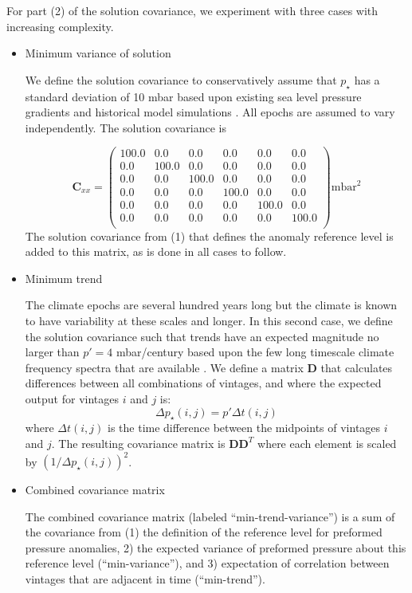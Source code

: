 \documentclass[12pt]{article}
\begin{document}
For part (2) of the solution covariance, we experiment with three cases with increasing complexity.
\begin{itemize}
\item Minimum variance of solution

  We define the solution covariance to conservatively assume that $p_{\star}$ has a standard deviation of 10 mbar based upon existing sea level pressure gradients and
  historical model simulations \cite{Hakim-Emile-Geay-2016:last}. All epochs are assumed to vary independently. The solution covariance is
  
\begin{equation}
\label{eq:6}
\mathbf{C}_{xx} = \left(
\begin{array}{cccccc}
100.0 & 0.0 & 0.0 & 0.0 & 0.0 & 0.0 \\
0.0 & 100.0 & 0.0 & 0.0 & 0.0 & 0.0 \\
0.0 & 0.0 & 100.0 & 0.0 & 0.0 & 0.0 \\
0.0 & 0.0 & 0.0 & 100.0 & 0.0 & 0.0 \\
0.0 & 0.0 & 0.0 & 0.0 & 100.0 & 0.0 \\
0.0 & 0.0 & 0.0 & 0.0 & 0.0 & 100.0 \\
\end{array}
\right) \mathrm{mbar}^{2}
\end{equation}
The solution covariance from (1) that defines the anomaly reference level is added to this matrix, as is done in all cases to follow.

\item Minimum trend

  The climate epochs are several hundred years long but the climate is
  known to have variability at these scales and longer. In this second
  case, we define the solution covariance such that trends have an
  expected magnitude no larger than $p\prime = 4$ mbar/century based
  upon the few long timescale climate frequency spectra that are
  available \cite{Huybers-Curry-2006:Links}. We define a matrix $\mathbf{D}$ that calculates differences between all combinations of vintages, and where the expected output for vintages $i$ and $j$ is:
  \begin{equation}
\label{eq:8}
{\Delta}p_{\star}(i,j) = p\prime {\Delta}t(i,j)
\end{equation}
where ${\Delta}t(i,j)$ is the time difference between the midpoints of vintages $i$ and $j$. 
The resulting covariance matrix is $\mathbf{D}\mathbf{D}^{T}$ where each element is scaled by $(1 / {\Delta}p_{\star}(i,j))^{2}$.

\item Combined covariance matrix

  The combined covariance matrix (labeled ``min-trend-variance'') is a sum of the covariance from (1) the definition of the reference level for preformed pressure anomalies, 2) the expected variance of preformed pressure about this reference level (``min-variance''), and 3) expectation of correlation between vintages that are adjacent in time (``min-trend'').
  
\end{itemize}
\end{document}
